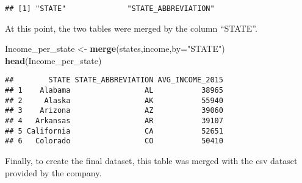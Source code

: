 \documentclass[]{article}
\newenvironment{Shaded}{\begin{snugshade}}{\end{snugshade}}
\newcommand{\KeywordTok}[1]{\textcolor[rgb]{0.13,0.29,0.53}{\textbf{#1}}}
\newcommand{\DataTypeTok}[1]{\textcolor[rgb]{0.13,0.29,0.53}{#1}}
\newcommand{\DecValTok}[1]{\textcolor[rgb]{0.00,0.00,0.81}{#1}}
\newcommand{\StringTok}[1]{\textcolor[rgb]{0.31,0.60,0.02}{#1}}
\newcommand{\OperatorTok}[1]{\textcolor[rgb]{0.81,0.36,0.00}{\textbf{#1}}}
\newcommand{\NormalTok}[1]{#1}
\begin{document}
\begin{Shaded}
\end{Shaded}

\begin{verbatim}
## [1] "STATE"              "STATE_ABBREVIATION"
\end{verbatim}

At this point, the two tables were merged by the column ``STATE''.

\begin{Shaded}
\begin{Highlighting}[]
\NormalTok{Income_per_state <-}\StringTok{ }\KeywordTok{merge}\NormalTok{(states,income,}\DataTypeTok{by=}\StringTok{"STATE"}\NormalTok{)}
\KeywordTok{head}\NormalTok{(Income_per_state)}
\end{Highlighting}
\end{Shaded}

\begin{verbatim}
##        STATE STATE_ABBREVIATION AVG_INCOME_2015
## 1    Alabama                 AL           38965
## 2     Alaska                 AK           55940
## 3    Arizona                 AZ           39060
## 4   Arkansas                 AR           39107
## 5 California                 CA           52651
## 6   Colorado                 CO           50410
\end{verbatim}

Finally, to create the final dataset, this table was merged with the csv
dataset provided by the company.
\end{document}
